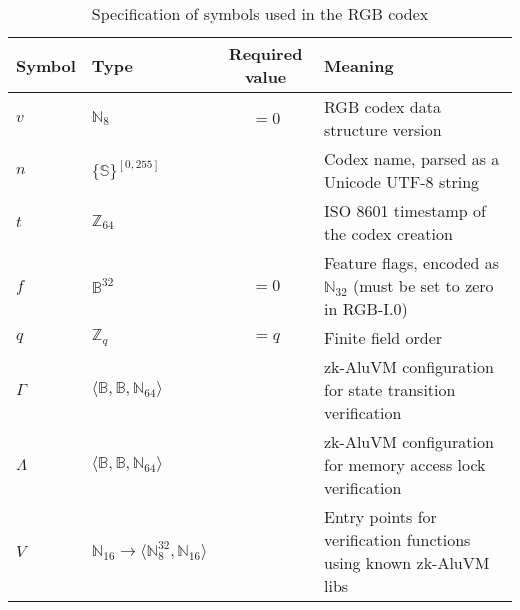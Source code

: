 \documentclass[9pt,oneside]{amsart}
\begin{document}
\begin{table}[h]
\centering
\caption{Specification of symbols used in the RGB codex}\label{tab:codex}
\begin{tabular}{ l l c p{9cm} }
\toprule
Symbol & Type & Required value & Meaning \\
\midrule
$v$ & $\mathbb{N}_8$ & $=0$ & RGB codex data structure version \\
$n$ & $\{ \mathbb{S} \}^{[0, 255]}$ &  & Codex name, parsed as a Unicode UTF-8 string \\
$t$ & $\mathbb{Z}_{64}$ &  & ISO 8601 timestamp of the codex creation \\
$f$ & $\mathbb{B}^{32}$ & $=0$ & Feature flags, encoded as $\mathbb{N}_{32}$ (must be set to zero in RGB-I.0) \\
$q$ & $\mathbb{Z}_q$ & $=q$ & Finite field order \\
$\mathsf{\Gamma}$ & $\langle \mathbb{B}, \mathbb{B}, \mathbb{N}_{64} \rangle$ &  &  zk-AluVM configuration for state transition verification \\
$\mathsf{\Lambda}$ & $\langle \mathbb{B}, \mathbb{B}, \mathbb{N}_{64} \rangle$ &  & zk-AluVM configuration for memory access lock verification \\
$V$ & $\mathbb{N}_{16} \rightarrow \langle \mathbb{N}_8^{32}, \mathbb{N}_{16} \rangle$ &  & Entry points for verification functions using known zk-AluVM libs \\
\bottomrule
\end{tabular}
\end{table}
\end{document}
